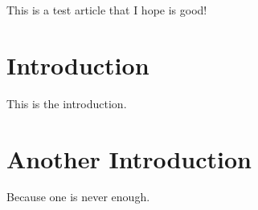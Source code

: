 This is a test article that I hope is good!
 
 
\section{Introduction}

    This is the introduction.

\section{Another Introduction}

    Because one is never enough.